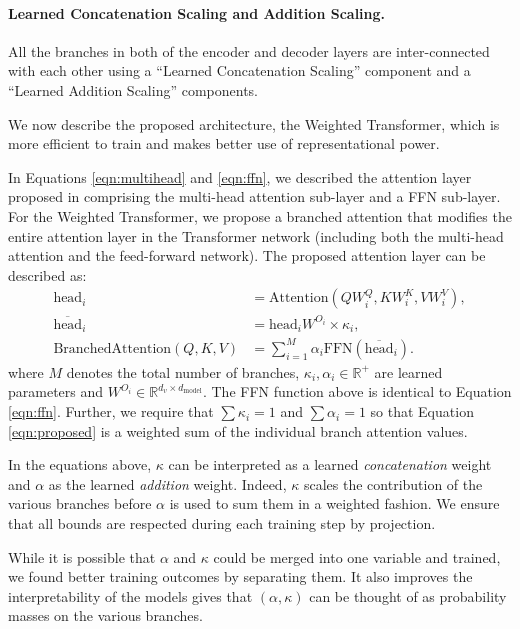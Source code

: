 \documentclass{article} %
\newcommand{\name}{Weighted Transformer\xspace}
\begin{document}
\paragraph{Learned Concatenation Scaling and Addition Scaling.} All the branches in both of the encoder and decoder layers are inter-connected with each other using a ``Learned Concatenation Scaling'' component and a ``Learned Addition Scaling'' components. 
\fi

{%
We now describe the proposed architecture, the \name, which is more efficient to train and makes better use of representational power. 


In Equations \eqref{eqn:multihead} and \eqref{eqn:ffn}, we described the attention layer proposed in \citet{vaswani2017attention} comprising the multi-head attention sub-layer and a FFN sub-layer. For the \name, we propose a branched attention that modifies the entire attention layer in the Transformer network (including both the multi-head attention and the feed-forward network). The proposed attention layer can be described as:
\begin{align}
\text{head}_i &=  \text{Attention}(QW_i^Q,KW_i^K,VW_i^V), \\
\overline{\text{head}}_i  &= \text{head}_i W^{O_i} \times \kappa_i, \label{eqn:proposed2} \\
\text{BranchedAttention}(Q,K,V) &= \sum_{i=1}^M \alpha_i \text{FFN}(\overline{\text{head}}_i).
\label{eqn:proposed}
\end{align} 
where $M$ denotes the total number of branches, $\kappa_i, \alpha_i \in \mathbb{R}^{+}$ are learned parameters and $W^{O_i} \in \mathbb{R}^{d_v \times d_{\text{model}}}$.  The FFN function above is identical to Equation \eqref{eqn:ffn}. Further, we require that $\sum \kappa_i = 1$ and $\sum \alpha_i = 1$ so that Equation \eqref{eqn:proposed} is a weighted sum of the individual branch attention values. %

In the equations above, $\kappa$ can be interpreted as a learned \textit{concatenation} weight and $\alpha$ as the learned \textit{addition} weight. Indeed, $\kappa$ scales the contribution of the various branches before $\alpha$ is used to sum them in a weighted fashion. We ensure that all bounds are respected during each training step by projection.

While it is possible that $\alpha$ and $\kappa$ could be merged into one variable and trained, we found better training outcomes by separating them. It also improves the interpretability of the models gives that $(\alpha,\kappa)$ can be thought of as probability masses on the various branches. 

}
\end{document}
